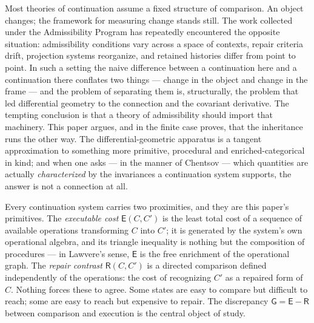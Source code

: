 \documentclass[11pt]{article}
\theoremstyle{remark}
\newcommand{\R}{\mathsf{R}}
\newcommand{\E}{\mathsf{E}}
\newcommand{\G}{\mathsf{G}}
\begin{document}
Most theories of continuation assume a fixed structure of comparison.
An object changes; the framework for measuring change stands still.
The work collected under the Admissibility Program has repeatedly
encountered the opposite situation: admissibility conditions vary
across a space of contexts, repair criteria drift, projection systems
reorganize, and retained histories differ from point to point. In
such a setting the naive difference between a continuation here and a
continuation there conflates two things --- change in the object and
change in the frame --- and the problem of separating them is,
structurally, the problem that led differential geometry to the
connection and the covariant derivative. The tempting conclusion is
that a theory of admissibility should import that machinery. This
paper argues, and in the finite case proves, that the inheritance
runs the other way. The differential-geometric apparatus is a tangent
approximation to something more primitive, procedural and
enriched-categorical in kind; and when one asks --- in the manner of
Chentsov --- which quantities are actually \emph{characterized} by
the invariances a continuation system supports, the answer is not a
connection at all.

Every continuation system carries two proximities, and they are
this paper's primitives. The \emph{executable cost} $\E(C,C')$ is the least
total cost of a sequence of available operations transforming $C$
into $C'$; it is generated by the system's own operational algebra,
and its triangle inequality is nothing but the composition of
procedures --- in Lawvere's sense, $\E$ is the free enrichment of the
operational graph. The \emph{repair contrast} $\R(C,C')$ is a
directed comparison defined independently of the operations: the cost
of recognizing $C'$ as a repaired form of $C$. Nothing forces these
to agree. Some states are easy to compare but difficult to reach;
some are easy to reach but expensive to repair. The discrepancy
$\G = \E - \R$ between comparison and execution is the central
object of study.
\end{document}

